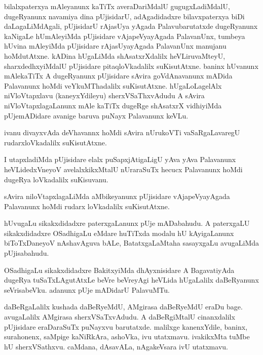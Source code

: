 \documentclass{article}
\begin{document}
\begin{mng}%
bilalxpaterxya mAleyanunx kaTiTx averaDariMdalU gugugxLadiMdalU, dugeRyanunx navamiya dina 
pUjisidarU, adAgadidadxre bilavxpaterxya biDi daLagaLiMdAgali, pUjisidarU rAjasUya yAgada 
Palavubarutatxde dugeRyanunx kaNigaLe hUmAleyiMda pUjisidare vAjapeVyayAgada PalavanUnx, tumbeya 
hUvina mAleyiMda pUjisidare rAjasUyayAgada PalavanUnx manujanu hoMdutAtxne. kADina hUgaLiMda 
shAsatxrXdalilx heVLiruvaMteyU, sharxdedhxyiMdalU pUjisidare pitaqloVkadalilx suKisutAtxne. 
baninx hUvanunx mAlekaTiTx A dugeRyanunx pUjisidare sAvira goVdAnavanunx mADida Palavanunx hoMdi 
veYkuMThadalilx suKisutAtxne. hUgaLoLagelAlx niVloVtapxlavu (kaneyxYdileyu) sherxVSaThxvAdudu A 
sAvira niVloVtapxlagaLanunx mAle kaTiTx dugeRge shAsatxrX vidhiyiMda pUjemADidare avanige baruva 
puNayx Palavanunx keVLu.
\end{mng}

\begin{mng}%
ivanu divayxvAda deVhavannx hoMdi sAvira nUrukoVTi vaSaRgaLavaregU rudarxloVkadalilx suKisutAtxne.
\end{mng}

\begin{mng}%
I utapxladiMda pUjisidare elalx puSapxjAtigaLigU yAva yAva Palavanunx heVLidedxVneyoV 
avelalxkikxMtalU nUraraSuTx hecucx Palavanunx hoMdi dugeRya loVkadalilx suKisuvanu.
\end{mng}

\begin{mng}%
sAvira niloVtapxlagaLiMda aMbikeyanunx pUjisidare vAjapeVyayAgada Palavanunx hoMdi rudarx 
loVkadalilx suKisutAtxne.
\end{mng}

\begin{mng}%
hUvugaLu sikakxdidadxre paterxgaLanunx pUje mADabahudu. A paterxgaLU sikakxdidadxre OSadhigaLu 
eMdare huTiTxda modalu hU kAyigaLanunx biToTxDaneyoV nAshavAguva bALe, BatatxgaLaMtaha sasayxgaLu 
avugaLiMda pUjisabahudu.
\end{mng}

\begin{mng}%
OSadhigaLu sikakxdidadxre BakitxyiMda dhAyxnisidare A BagavatiyAda dugeRya tuSaTxLAgutAtxLe beVre 
beVreyAgi heVLida hUgaLalilx daBeRyanunx seVrisabeVku. adanunx pUje mADidarU PalavuMTu.
\end{mng}

\begin{mng}%
daBeRgaLalilx kushada daBeRyeMdU, AMgirasa daBeRyeMdU eraDu bage. avugaLalilx AMgirasa 
sherxVSaTxvAdudu. A daBeRgiMtalU cinanxdalilx pUjisidare eraDaraSuTx puNayxvu barutatxde. 
malilxge kanenxYdile, baninx, surahonenx, saMpige kaNiRkAra, ashoVka, ivu utatxmavu. ivakikxMta 
tuMbe hU sherxVSathxvu. caMdana, dAsavALa, nAgakeVsara ivU utatxmavu.
\end{mng}
\end{document}
